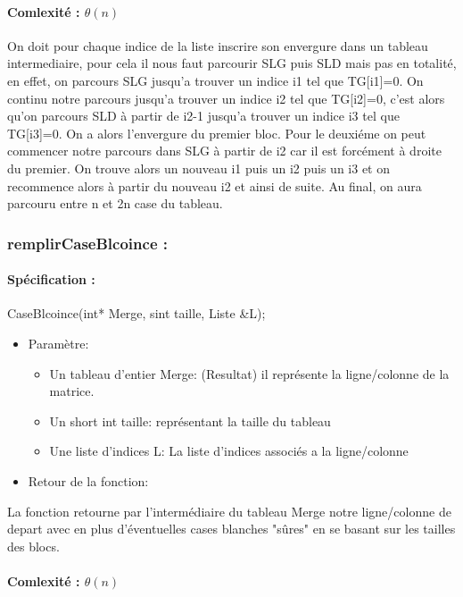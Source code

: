\documentclass{article}
\begin{document}
\paragraph{Comlexité : $\theta(n)$\newline}
On doit pour chaque indice de la liste inscrire son envergure dans un tableau intermediaire, pour cela il nous faut parcourir SLG puis SLD mais pas en totalité, en effet, on parcours SLG jusqu'a trouver un indice i1 tel que TG[i1]=0.
On continu notre parcours jusqu'a trouver un indice i2 tel que TG[i2]=0, c'est alors qu'on parcours SLD à partir de i2-1 jusqu'a trouver un indice i3 tel que TG[i3]=0. 
On a alors l'envergure du premier bloc. Pour le deuxiéme on peut commencer notre parcours dans SLG à partir de i2 car il est forcément à droite du premier.\newline 
On trouve alors un nouveau i1 puis un i2 puis un i3 et on recommence alors à partir du nouveau i2 et ainsi de suite. Au final, on aura parcouru entre n et 2n case du tableau.
\subsubsection{remplirCaseBlcoince :}
\paragraph{Spécification :}CaseBlcoince(int* Merge, sint taille, Liste \&L);
\begin{itemize}
\item Param\`etre:
\begin{itemize}
\item Un tableau d'entier Merge: (Resultat) il représente la ligne/colonne de la matrice.
\item Un short int taille: représentant la taille du tableau
\item Une liste d'indices L: La liste d'indices associés a la ligne/colonne
\end{itemize}
\item Retour de la fonction:
\end{itemize}
La fonction retourne par l'intermédiaire du tableau Merge notre ligne/colonne de depart avec en plus d'éventuelles cases blanches "sûres" en se basant sur les tailles des blocs.
\paragraph{Comlexité : $\theta(n)$\newline}
\end{document}
